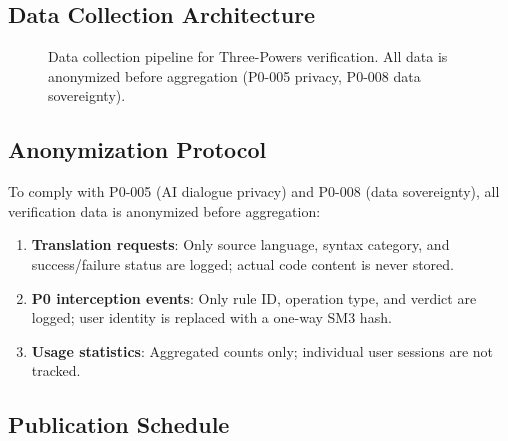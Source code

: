 \subsection{Data Collection Architecture}

\begin{figure}[h]
\centering
{}
\caption{Data collection pipeline for Three-Powers verification.
  All data is anonymized before aggregation (P0-005 privacy,
  P0-008 data sovereignty).}
\label{fig:data-pipeline}
\end{figure}

\subsection{Anonymization Protocol}

To comply with P0-005 (AI dialogue privacy) and P0-008 (data
sovereignty), all verification data is anonymized before
aggregation:

\begin{enumerate}
  \item \textbf{Translation requests}: Only source language,
    syntax category, and success/failure status are logged;
    actual code content is never stored.
  \item \textbf{P0 interception events}: Only rule ID, operation
    type, and verdict are logged; user identity is replaced with
    a one-way SM3 hash.
  \item \textbf{Usage statistics}: Aggregated counts only;
    individual user sessions are not tracked.
\end{enumerate}

\subsection{Publication Schedule}

